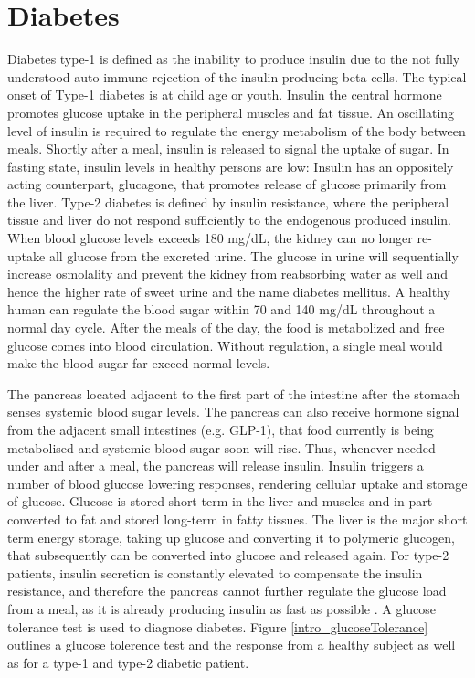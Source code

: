 \section{Diabetes}
Diabetes type-1 is defined as the inability to produce insulin due to the not fully understood auto-immune rejection of the insulin producing beta-cells. The typical onset of Type-1 diabetes is at child age or youth. Insulin the central hormone promotes glucose uptake in the peripheral muscles and fat tissue. An oscillating level of insulin is required to regulate the energy metabolism of the body between meals. Shortly after a meal, insulin is released to signal the uptake of sugar. In fasting state, insulin levels in healthy persons are low: Insulin has an oppositely acting counterpart, glucagone, that promotes release of glucose primarily from the liver. Type-2 diabetes is defined by insulin resistance, where the peripheral tissue and liver do not respond sufficiently to the endogenous produced insulin. When blood glucose levels exceeds 180 mg/dL, the kidney can no longer re-uptake all glucose from the excreted urine. The glucose in urine will sequentially increase osmolality and prevent the kidney from reabsorbing water as well and hence the higher rate of sweet urine and the name diabetes mellitus. A healthy human can regulate the blood sugar within 70 and 140 mg/dL throughout a normal day cycle. After the meals of the day, the food is metabolized and free glucose comes into blood circulation. Without regulation, a single meal would make the blood sugar far exceed normal levels.\cite{silverthorn2010human,Cowart1990}

The pancreas located adjacent to the first part of the intestine after the stomach senses systemic blood sugar levels. The pancreas can also receive hormone signal from the adjacent small intestines (e.g. GLP-1), that food currently is being metabolised and systemic blood sugar soon will rise. Thus, whenever needed under and after a meal, the pancreas will release insulin. Insulin triggers a number of blood glucose lowering responses, rendering cellular uptake and storage of glucose. Glucose is stored short-term in the liver and muscles and in part converted to fat and stored long-term in fatty tissues. The liver is the major short term energy storage, taking up glucose and converting it to polymeric glucogen, that subsequently can be converted into glucose and released again. For type-2 patients, insulin secretion is constantly elevated to compensate the insulin resistance, and therefore the pancreas cannot further regulate the glucose load from a meal, as it is already producing insulin as fast as possible \cite{silverthorn2010human}. A glucose tolerance test is used to diagnose diabetes. Figure \cref{intro_glucoseTolerance} outlines a glucose tolerence test and the response from a healthy subject as well as for a type-1 and type-2 diabetic patient.


